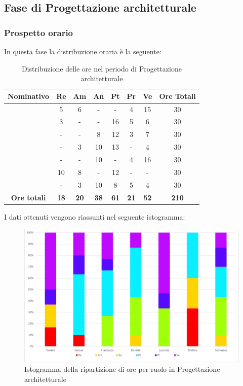\subsection{Fase di Progettazione architetturale}
\subsubsection{Prospetto orario}
In questa fase la distribuzione oraria è la seguente:
\begin{table}[H]
		\begin{center}
			\setlength{\aboverulesep}{0pt}
			\setlength{\belowrulesep}{0pt}
			\setlength{\extrarowheight}{.75ex}
			\begin{tabular}{ c c c c c c c c }
				\rowcolor{AzzurroGruppo!30} 
				\textbf{Nominativo} & \textbf{Re} & \textbf{Am} & \textbf{An} & \textbf{Pt} & \textbf{Pr} & \textbf{Ve} & \textbf{Ore Totali}  \\
				\toprule
				\Davide    & 5  & 6 & -  & -  & 4 & 15 & 30 \\
				\Giosue    & 3  & - & -  & 16 & 5 & 6  & 30 \\
				\Francesco & -  & - & 8  & 12 & 3 & 7  & 30\\
				\Daniele   & -  & 3 & 10 & 13 & - & 4  & 30\\
				\Lucrezia  & -  & - & 10 & -  & 4 & 16 & 30\\
				\Matteo    & 10 & 8 & -  & 12 & - & -  & 30\\
				\Tommaso   & -  & 3 & 10 & 8  & 5 & 4  & 30\\
				 \textbf{Ore totali} & \textbf{18} & \textbf{20} & \textbf{38} & \textbf{61} & \textbf{21} & \textbf{52} & \textbf{210} \\
				\bottomrule
			\end{tabular}
			\caption{Distribuzione delle ore nel periodo di  Progettazione architetturale}
		\end{center}
	\end{table}
I dati ottenuti vengono riassunti nel seguente istogramma:
\begin{figure}[H]
    \centering
    \includegraphics[scale = 0.5]{components/img/Architettura-isto.png}
    \caption{Istogramma della ripartizione di ore per ruolo in Progettazione architetturale}
    \label{fig:istogramma ripartizione ore , fase di Progettazione architetturale}
\end{figure}
